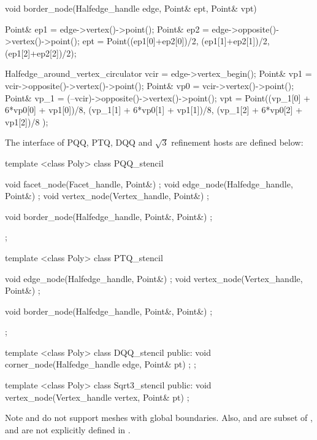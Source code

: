 

\begin{ccExampleCode}
  void border_node(Halfedge_handle edge, Point& ept, Point& vpt) {
    Point& ep1 = edge->vertex()->point();
    Point& ep2 = edge->opposite()->vertex()->point();
    ept = Point((ep1[0]+ep2[0])/2, (ep1[1]+ep2[1])/2, (ep1[2]+ep2[2])/2);

    Halfedge_around_vertex_circulator vcir = edge->vertex_begin();
    Point& vp1  = vcir->opposite()->vertex()->point();
    Point& vp0  = vcir->vertex()->point();
    Point& vp_1 = (--vcir)->opposite()->vertex()->point();
    vpt = Point((vp_1[0] + 6*vp0[0] + vp1[0])/8,
                (vp_1[1] + 6*vp0[1] + vp1[1])/8,
                (vp_1[2] + 6*vp0[2] + vp1[2])/8 );
  }
\end{ccExampleCode}


The interface of PQQ, PTQ, DQQ and $\sqrt{3}$ refinement hosts are 
defined below:


\begin{ccExampleCode}
template <class Poly>
class PQQ_stencil {
  void facet_node(Facet_handle, Point&) {};
  void edge_node(Halfedge_handle, Point&) {};
  void vertex_node(Vertex_handle, Point&) {};

  void border_node(Halfedge_handle, Point&, Point&) {};
};

template <class Poly>
class PTQ_stencil {
  void edge_node(Halfedge_handle, Point&) {};
  void vertex_node(Vertex_handle, Point&) {};

  void border_node(Halfedge_handle, Point&, Point&) {};
};

template <class Poly>
class DQQ_stencil {
public:
  void corner_node(Halfedge_handle edge, Point& pt) {};
};

template <class Poly>
class Sqrt3_stencil {
public:
  void vertex_node(Vertex_handle vertex, Point& pt) {}
};
\end{ccExampleCode}

Note  and  do not support
meshes with global boundaries. Also,  and
 are subset of , and are not
explicitly defined in .


